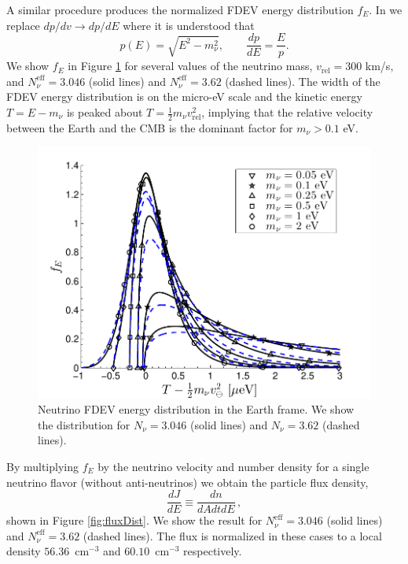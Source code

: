 A similar procedure produces the normalized FDEV energy distribution $f_E$.  In  we replace $dp/dv\to dp/dE$ where it is understood that 
\begin{equation}
p(E)=\sqrt{E^2-m_\nu^2},\qquad \frac{dp}{dE}=\frac{E}{p}.
\end{equation}
We show $f_E$ in Figure \ref{fig:EDist300}  for several values of the neutrino mass, $v_{\text{rel}}=300$ km/s, and $N_\nu^{\mathrm{eff}}=3.046$ (solid lines) and $N_\nu^{\mathrm{eff}}=3.62$ (dashed lines). The width of the FDEV energy distribution is on the micro-eV scale and the kinetic energy $T=E-m_\nu$ is peaked about $T=\frac{1}{2}m_\nu v_{\text{rel}}^2$, implying that the relative velocity between the Earth and the CMB is the dominant factor for $m_\nu>0.1$ eV.

\begin{figure}
\centerline{\includegraphics[width=0.9\linewidth]{plots/E_dist_300.pdf}}
\caption{Neutrino FDEV energy distribution in the Earth frame. We show the distribution for $N_\nu=3.046$ (solid lines) and $N_\nu=3.62$ (dashed lines). }
\label{fig:EDist300}
 \end{figure}

By multiplying $f_E$ by the neutrino velocity and number density for a single neutrino flavor (without anti-neutrinos) we obtain the particle flux density,
 \begin{equation}
 \frac{dJ}{dE}\equiv\frac{dn}{dAdtdE}\,,
\end{equation} 
shown in Figure \ref{fig:fluxDist}. We show the result for $N_\nu^{\mathrm{eff}}=3.046$ (solid lines) and $N_\nu^{\mathrm{eff}}=3.62$ (dashed lines). The flux is normalized in these cases to a local density $56.36$~cm${}^{-3}$ and $60.10$~cm${}^{-3}$ respectively. 

